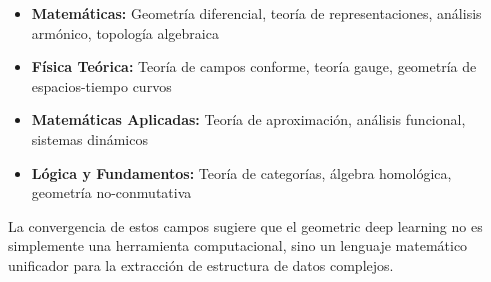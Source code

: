 \begin{itemize}
\item \textbf{Matemáticas:} Geometría diferencial, teoría de representaciones, análisis armónico, topología algebraica
\item \textbf{Física Teórica:} Teoría de campos conforme, teoría gauge, geometría de espacios-tiempo curvos
\item \textbf{Matemáticas Aplicadas:} Teoría de aproximación, análisis funcional, sistemas dinámicos
\item \textbf{Lógica y Fundamentos:} Teoría de categorías, álgebra homológica, geometría no-conmutativa
\end{itemize}

La convergencia de estos campos sugiere que el geometric deep learning no es simplemente una herramienta computacional, sino un lenguaje matemático unificador para la extracción de estructura de datos complejos.